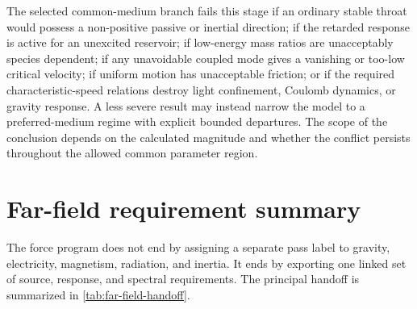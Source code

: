 The selected common-medium branch fails this stage if an ordinary stable throat
would possess a non-positive passive or inertial direction; if the retarded
response is active for an unexcited reservoir; if low-energy mass ratios are
unacceptably species dependent; if any unavoidable coupled mode gives a
vanishing or too-low critical velocity; if uniform motion has unacceptable
friction; or if the required characteristic-speed relations destroy light
confinement, Coulomb dynamics, or gravity response. A less severe result may
instead narrow the model to a preferred-medium regime with explicit bounded
departures. The scope of the conclusion depends on the calculated magnitude and
whether the conflict persists throughout the allowed common parameter region.

\section{Far-field requirement summary}

The force program does not end by assigning a separate pass label to gravity,
electricity, magnetism, radiation, and inertia. It ends by exporting one linked
set of source, response, and spectral requirements. The principal handoff is
summarized in \cref{tab:far-field-handoff}.

